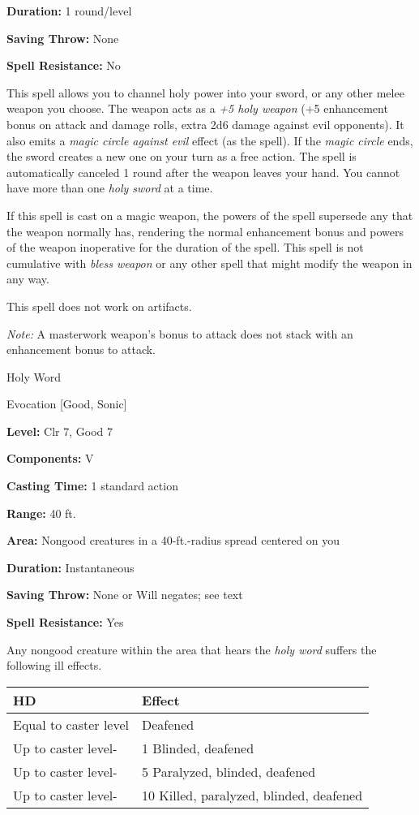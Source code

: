 \documentclass{article}
\begin{document}
\textbf{Duration:} 1 round/level

\textbf{Saving Throw:} None

\textbf{Spell Resistance:} No

This spell allows you to channel holy power into your sword, or any other melee 
weapon you choose. The weapon acts as a \textit{+5 holy weapon }(+5 enhancement 
bonus on attack and damage rolls, extra 2d6 damage against evil opponents). It 
also emits a \textit{magic circle against evil }effect (as the spell). If the \textit{magic 
circle }ends, the sword creates a new one on your turn as a free action. The spell 
is automatically canceled 1 round after the weapon leaves your hand. You cannot 
have more than one \textit{holy sword }at a time.

If this spell is cast on a magic weapon, the powers of the spell supersede any 
that the weapon normally has, rendering the normal enhancement bonus and powers 
of the weapon inoperative for the duration of the spell. This spell is not cumulative 
with \textit{bless weapon }or any other spell that might modify the weapon in any 
way.

This spell does not work on artifacts.

\textit{Note: }A masterwork weapon's bonus to attack does not stack with an enhancement 
bonus to attack.

\vspace{12pt}
Holy Word

Evocation [Good, Sonic]

\textbf{Level:} Clr 7, Good 7

\textbf{Components:} V

\textbf{Casting Time:} 1 standard action

\textbf{Range:} 40 ft.

\textbf{Area:} Nongood creatures in a 40-ft.-radius spread centered on you

\textbf{Duration:} Instantaneous

\textbf{Saving Throw:} None or Will negates; see text

\textbf{Spell Resistance:} Yes

Any nongood creature within the area that hears the \textit{holy word }suffers 
the following ill effects.

\begin{tabular}{|>{\raggedright}p{80pt}|>{\raggedright}p{161pt}|}
\hline
H\textbf{D} & E\textbf{ffect}\tabularnewline
\hline
Equal to caster level & Deafened\tabularnewline
\hline
Up to caster level- & 1 Blinded, deafened\tabularnewline
\hline
Up to caster level- & 5 Paralyzed, blinded, deafened\tabularnewline
\hline
Up to caster level- & 10 Killed, paralyzed, blinded, deafened\tabularnewline
\hline
\end{tabular}
\end{document}
